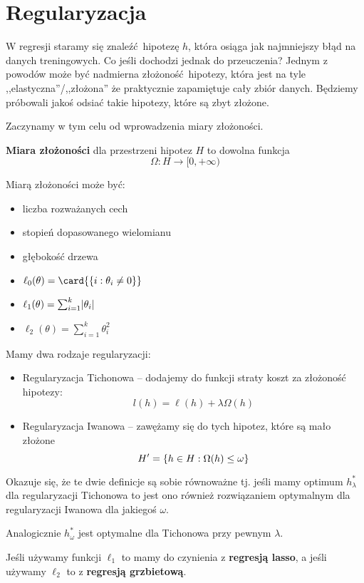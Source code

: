 \chapter{Regularyzacja}

W regresji staramy się znaleźć hipotezę \( h \), która osiąga jak najmniejszy błąd na danych treningowych. Co jeśli dochodzi jednak do przeuczenia?
Jednym z powodów może być nadmierna złożoność hipotezy, która jest na tyle ,,elastyczna''/,,złożona'' że praktycznie zapamiętuje cały zbiór danych.
Będziemy próbowali jakoś odsiać takie hipotezy, które są zbyt złożone.

Zaczynamy w tym celu od wprowadzenia miary złożoności.
\begin{definition}
\textbf{Miara złożoności} dla przestrzeni hipotez \( H \)
to dowolna funkcja
\[
    \Omega : H \rightarrow [0, +\infty)
\]
\end{definition}
Miarą złożoności może być:
\begin{itemize}
    \item liczba rozważanych cech
    \item stopień dopasowanego wielomianu
    \item głębokość drzewa
    \item \( \ell_0(\theta) = \card{\set{i : \theta_i \neq 0}} \)
    \item \( \ell_1(\theta) = \sum_{i=1}^k \abs{\theta_i} \)
    \item \( \ell_2(\theta) = \sum_{i=1}^k \theta_i^2 \)
\end{itemize}

Mamy dwa rodzaje regularyzacji:
\begin{itemize}
    \item Regularyzacja Tichonowa -- dodajemy do funkcji straty koszt za złożoność hipotezy:
    \[
        l(h) = \ell(h) + \lambda \Omega(h)
    \]
    
    \item Regularyzacja Iwanowa -- zawężamy się do tych hipotez, które są mało złożone
    \[
        H' = \set{h \in H : \Omega(h) \leq \omega}
    \]
\end{itemize}

Okazuje się, że te dwie definicje są sobie równoważne tj. jeśli mamy optimum \( h^*_\lambda \) dla regularyzacji Tichonowa to jest ono również rozwiązaniem optymalnym dla regularyzacji Iwanowa dla jakiegoś \( \omega \).

Analogicznie \( h^*_\omega \) jest optymalne dla Tichonowa przy pewnym \( \lambda \).

Jeśli używamy funkcji \( \ell_1 \) to mamy do czynienia z \textbf{regresją lasso}, a jeśli używamy \( \ell_2 \) to z \textbf{regresją grzbietową}.